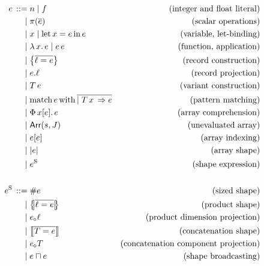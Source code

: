 \begin{align*}
\graintro e
n \mid f  
& \text{(integer and float literal)} 
\graitem
\pi(\overline{e}) 
& \text{(scalar operations)}
\graitem
x
\mid \slet{x}{e}{e}
& \text{(variable, let-binding)}
\graitem
\slam{x}{e}
\mid e\,e 
& \text{(function, application)}
\graitem
\srecordval{\overline{\ell = e}} 
& \text{(record construction)}
\graitem
\sproj{e}{\ell} 
& \text{(record projection)}
\graitem
\stag{T}{e} 
& \text{(variant construction)}
\graitem
\smatch{e}{\overline{\mid T\,x\,\Rightarrow e}} 
& \text{(pattern matching)}
\graitem
\sbuild{x}{e}{e} 
& \text{(array comprehension)}
\graitem
\sarrayval{s}{J} 
& \text{(unevaluated array)}
\graitem
\sindex{e}{e} 
& \text{(array indexing)}
\graitem
\sshape{e} 
& \text{(array shape)} 
\graitem
\eess
& \text{(shape expression)} 
\\ \\
\graintro{\eess}
\ssize{e} 
& \text{(sized shape)}
\graitem
\sproductval{\overline{ \ell = e }} 
& \text{(product shape)} 
\graitem
\sproductproj{e}{\ell} 
& \text{(product dimension projection)}
\graitem
\sconcatval{\overline{ T = e }} & \text{(concatenation shape)}
\graitem
\sconcatproj{e}{T} 
& \text{(concatenation component projection)}
\graitem
\sbroadcast{e}{e} 
& \text{(shape broadcasting)}
\end{align*}